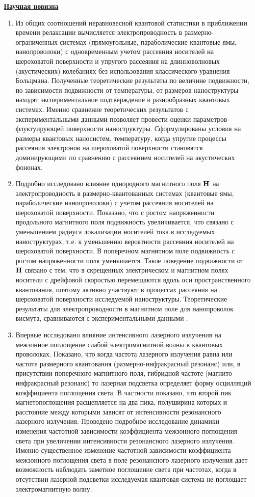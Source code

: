 \underline{\textbf{Научная новизна}}
\begin{enumerate}
	\item Из общих соотношений неравновесной квантовой статистики в приближении времени релаксации вычисляется электропроводность в размерно-ограниченных системах (прямоугольные, параболические квантовые ямы, нанопроволоки) с одновременным учетом рассеяния носителей на шероховатой поверхности и упругого рассеяния на длинноволновых (акустических) колебаниях без использования классического уравнения Больцмана. Полученные теоретические результаты по величине подвижности, по зависимости подвижности от температуры,  от размеров наноструктуры находят экспериментальное подтверждение в разнообразных квантовых системах. Именно сравнение теоретических результатов с экспериментальными данными позволяет провести оценки параметров флуктуирующей поверхности наноструктуры. Сформулированы условия на размеры квантовых наносистем, температуру, когда упругие процессы рассеяния электронов на шероховатой поверхности становятся доминирующими по сравнению с рассеянием носителей на акустических фононах.
	\item Подробно исследовано влияние однородного магнитного поля $\boldsymbol{\mathbf{H}}$ на электропроводность в размерно-квантованных системах (квантовые ямы, параболические нанопроволоки) с учетом рассеяния носителей на шероховатой поверхности. Показано, что с ростом напряженности продольного магнитного поля подвижность увеличивается, что связано с уменьшением радиуса локализации носителей тока в исследуемых наноструктурах, т.е. к уменьшению вероятности рассеяния носителей на шероховатой поверхности. В поперечном магнитном поле подвижность с ростом напряженности поля уменьшается. Такое поведение подвижности от $\boldsymbol{\mathbf{H}}$ связано с тем, что в скрещенных электрическом и магнитном полях носители с дрейфовой скоростью перемещаются вдоль оси пространственного квантования, поэтому активно участвуют в процессах рассеяния на шероховатой поверхности исследуемой наноструктуры. Теоретические результаты для электропроводности в магнитном поле для нанопроволок висмута, сравниваются с экспериментальными данными .
	\item Впервые исследовано влияние интенсивного лазерного излучения на межзонное поглощение слабой электромагнитной волны в квантовых проволоках. Показано, что когда частота лазерного излучения равна или частоте размерного квантования (размерно-инфракрасный резонанс) или, в присутствии поперечного магнитного поля, гибридной частоте (магнито-инфракрасный резонанс) то лазерная подсветка определяет форму осцилляций коэффициента поглощения света. В частности показано, что второй пик магнетопоглощения расщепляется на два пика, полуширина которых и расстояние между которыми зависят от интенсивности резонансного лазерного излучения. Проведено подробное исследование динамики изменения частотной зависимости коэффициента межзонного поглощения света при увеличении интенсивности резонансного лазерного излучения. Именно существенное изменение частотной зависимости коэффициента межзонного поглощения света в поле резонансного лазерного излучения дает возможность наблюдать заметное поглощение света при частотах, когда в отсутствии лазерной подсветки исследуемая квантовая система не поглощает электромагнитную волну.

\end{enumerate}
